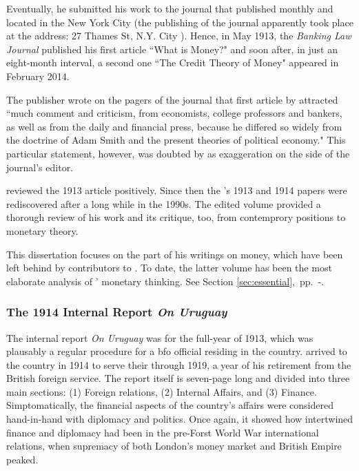 Eventually, he submitted his work to the journal that published monthly and located in the New York City (the publishing of the journal apparently took place at the address: 27 Thames St, N.Y. City ). Hence, in May 1913, the \textit{Banking Law Journal} published his first article ``What is Money?" and soon after, in just an eight-month interval, a second one ``The Credit Theory of Money" appeared in February 2014.

The publisher wrote on the pagers of the journal that first article by \citeauthor{innes1913} attracted ``much comment and criticism, from economists, college professors and bankers, as well as from the daily and financial press, because he differed so widely from the doctrine of Adam Smith and the present theories of political economy." This particular statement, however, was doubted by \cite[p.~223]{wray2004_} as exaggeration on the side of the journal's editor.

\cite{keynes1914} reviewed the 1913 article positively. Since then the \citeauthor{innes1913}'s 1913 and 1914 papers were rediscovered after a long while in the 1990s. The edited volume \cite{wray2004} provided a thorough review of his work and its critique, too, from contemprory positions to monetary theory. 

This dissertation focuses on the part of his writings on money, which have been left behind by contributors to \cite{wray2004}. To date, the latter volume has been the most elaborate analysis of \citeauthor{innes1913}' monetary thinking. See Section \ref{sec:essential},~pp.~\pageref{sec:essential}-\pageref{sec:critique}.

\subsubsection{The 1914 Internal Report \textit{On Uruguay}}\label{sec:uruguay}

The internal report \textit{On Uruguay} was for the full-year of 1913, which was plausably a regular procedure for a \ac{bfo} official residing in the country. \citeauthor{innes1914a} arrived to the country in 1914 to serve their through 1919, a year of his retirement from the British foreign service. The report itself is seven-page long and divided into three main sections: (1) Foreign relations, (2) Internal Affairs, and (3) Finance. Simptomatically, the financial aspects of the country's affairs were considered hand-in-hand with diplomacy and politics. Once again, it showed how intertwined finance and diplomacy had been in the pre-Forst World War international relations, when supremacy of both London's money market and British Empire peaked.   

